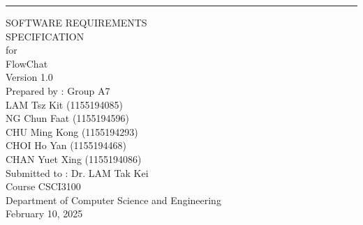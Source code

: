 \documentclass[11pt, a4paper]{article}
\def\myversion{1.0}
\def\submitdate{February 10, 2025}
\begin{document}
\begin{flushright}
    \rule{16cm}{2pt}\vskip1cm

        SOFTWARE REQUIREMENTS\\ SPECIFICATION\\
        \vspace{1cm}
        for\\
        \vspace{1cm}
        FlowChat\\
        \vspace{1cm}
        {Version \myversion}\\
        \vspace{1cm}
        Prepared by :  Group A7\\
        \vspace{0.5cm}
        LAM Tsz Kit (1155194085)\\
        NG Chun Faat (1155194596)\\
        CHU Ming Kong (1155194293)\\
        CHOI Ho Yan (1155194468)\\
        CHAN Yuet Xing (1155194086)\\
        \vspace{1cm}
        Submitted to : Dr. LAM Tak Kei\\
        \vspace{1cm}
        Course CSCI3100\\
        Department of Computer Science and Engineering\\
        \vspace{1.cm}
        \submitdate

\end{flushright}

\newpage
\tableofcontents
\end{document}
